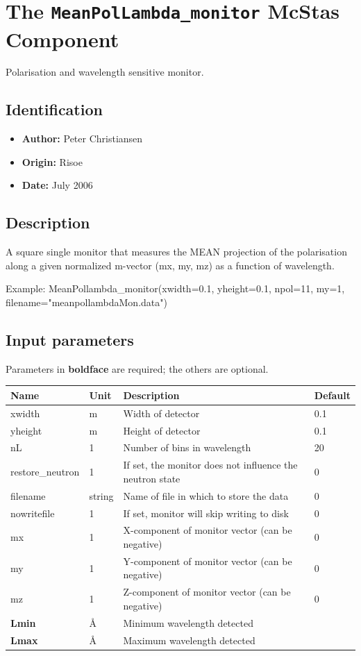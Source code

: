 \section{The \texttt{MeanPolLambda\_monitor} McStas Component}
Polarisation and wavelength sensitive monitor.

\subsection*{Identification}
\begin{itemize}
  \item \textbf{Author:} Peter Christiansen
  \item \textbf{Origin:} Risoe
  \item \textbf{Date:} July 2006
\end{itemize}

\subsection*{Description}
A square single monitor that measures the MEAN projection of the polarisation along a given normalized m-vector (mx, my, mz) as a function of wavelength.

Example: MeanPollambda\_monitor(xwidth=0.1, yheight=0.1, npol=11, my=1, filename="meanpollambdaMon.data")

\subsection*{Input parameters}
Parameters in \textbf{boldface} are required; the others are optional.

\begin{longtable}{p{}p{}p{}p{}}
\toprule
\textbf{Name} & \textbf{Unit} & \textbf{Description} & \textbf{Default} \\
\midrule
\endhead
xwidth & m & Width of detector & 0.1 \\
yheight & m & Height of detector & 0.1 \\
nL & 1 & Number of bins in wavelength & 20 \\
restore\_neutron & 1 & If set, the monitor does not influence the neutron state & 0 \\
filename & string & Name of file in which to store the data & 0 \\
nowritefile & 1 & If set, monitor will skip writing to disk & 0 \\
mx & 1 & X-component of monitor vector (can be negative) & 0 \\
my & 1 & Y-component of monitor vector (can be negative) & 0 \\
mz & 1 & Z-component of monitor vector (can be negative) & 0 \\
\textbf{Lmin} & \AA{} & Minimum wavelength detected &  \\
\textbf{Lmax} & \AA{} & Maximum wavelength detected &  \\
\bottomrule
\end{longtable}

